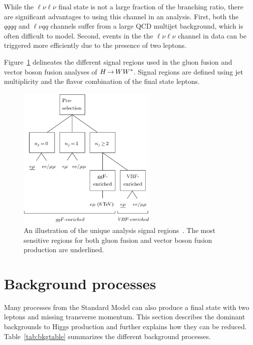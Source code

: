 While the $\ell\nu\ell\nu$ final state is not a large fraction of the branching ratio, there are significant advantages to using this channel in an analysis. First, both the $qqqq$ and $\ell\nu qq$ channels suffer from a large QCD multijet background, which is often difficult to model. Second, events in the the $\ell\nu\ell\nu$ channel in data can be triggered more efficiently due to the presence of two leptons. 

Figure~\ref{fig:analysisregions} delineates the different signal regions used in the gluon fusion and vector boson fusion analyses of $H{\,{\rightarrow}\,}WW^\ast$. Signal regions are defined using jet multiplicity and the flavor combination of the final state leptons. 

\begin{figure}[h!]
  \centering
  \captionsetup{justification=centering}

  \includegraphics[width=0.6\textwidth]{figures/analysis_regions}
  \caption{An illustration of the unique analysis signal regions~\cite{WW2015}. The most sensitive regions for both gluon fusion and vector boson fusion production are underlined. }
  \label{fig:analysisregions}
\end{figure}

\section{Background processes}

Many processes from the Standard Model can also produce a final state with two leptons and missing transverse momentum. This section describes the dominant backgrounds to Higgs production and further explains how they can be reduced. Table~\ref{tab:bkgtable} summarizes the different background processes. 

